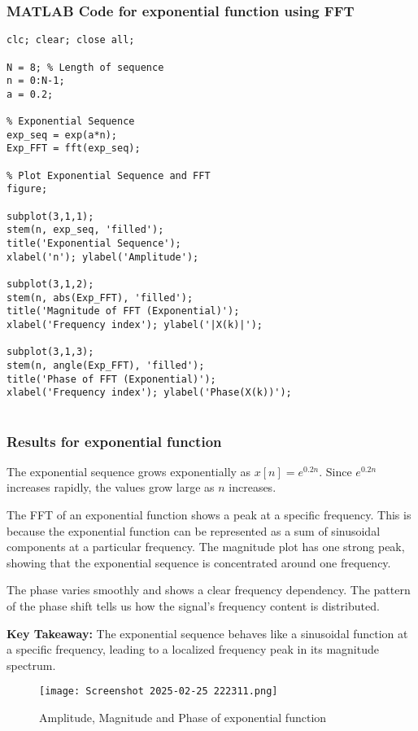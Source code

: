 \documentclass[a4paper,12pt]{article}
\begin{document}
\subsubsection{MATLAB Code for exponential function using FFT}
\begin{verbatim}
clc; clear; close all;

N = 8; % Length of sequence
n = 0:N-1;
a = 0.2;

% Exponential Sequence
exp_seq = exp(a*n);
Exp_FFT = fft(exp_seq);

% Plot Exponential Sequence and FFT
figure;

subplot(3,1,1);
stem(n, exp_seq, 'filled'); 
title('Exponential Sequence');
xlabel('n'); ylabel('Amplitude');

subplot(3,1,2);
stem(n, abs(Exp_FFT), 'filled'); 
title('Magnitude of FFT (Exponential)');
xlabel('Frequency index'); ylabel('|X(k)|');

subplot(3,1,3);
stem(n, angle(Exp_FFT), 'filled'); 
title('Phase of FFT (Exponential)');
xlabel('Frequency index'); ylabel('Phase(X(k))');


\end{verbatim}
\subsubsection{Results for exponential function}
The exponential sequence grows exponentially as \( x[n] = e^{0.2n} \). Since \( e^{0.2n} \) increases rapidly, the values grow large as \( n \) increases.

The FFT of an exponential function shows a peak at a specific frequency. This is because the exponential function can be represented as a sum of sinusoidal components at a particular frequency. The magnitude plot has one strong peak, showing that the exponential sequence is concentrated around one frequency.

The phase varies smoothly and shows a clear frequency dependency. The pattern of the phase shift tells us how the signal’s frequency content is distributed.

\textbf{Key Takeaway:} The exponential sequence behaves like a sinusoidal function at a specific frequency, leading to a localized frequency peak in its magnitude spectrum.
\begin{figure}[h]
    \centering
    \texttt{[image: Screenshot 2025-02-25 222311.png]}
    \caption{Amplitude, Magnitude and Phase of exponential function}
    \label{fig:impulse_fft_result}
\end{figure}
\end{document}

